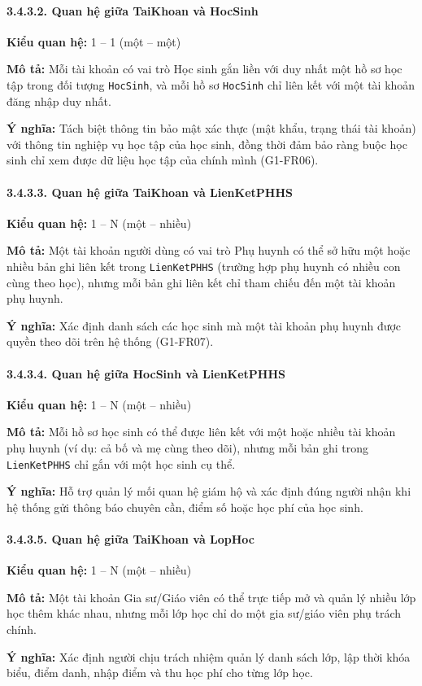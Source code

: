 \paragraph{3.4.3.2. Quan hệ giữa TaiKhoan và HocSinh}\mbox{}\par
\textbf{Kiểu quan hệ:} 1 -- 1 (một -- một)\par
\textbf{Mô tả:} Mỗi tài khoản có vai trò Học sinh gắn liền với duy nhất một hồ sơ học tập trong đối tượng \texttt{HocSinh}, và mỗi hồ sơ \texttt{HocSinh} chỉ liên kết với một tài khoản đăng nhập duy nhất.\par
\textbf{Ý nghĩa:} Tách biệt thông tin bảo mật xác thực (mật khẩu, trạng thái tài khoản) với thông tin nghiệp vụ học tập của học sinh, đồng thời đảm bảo ràng buộc học sinh chỉ xem được dữ liệu học tập của chính mình (G1-FR06).

\paragraph{3.4.3.3. Quan hệ giữa TaiKhoan và LienKetPHHS}\mbox{}\par
\textbf{Kiểu quan hệ:} 1 -- N (một -- nhiều)\par
\textbf{Mô tả:} Một tài khoản người dùng có vai trò Phụ huynh có thể sở hữu một hoặc nhiều bản ghi liên kết trong \texttt{LienKetPHHS} (trường hợp phụ huynh có nhiều con cùng theo học), nhưng mỗi bản ghi liên kết chỉ tham chiếu đến một tài khoản phụ huynh.\par
\textbf{Ý nghĩa:} Xác định danh sách các học sinh mà một tài khoản phụ huynh được quyền theo dõi trên hệ thống (G1-FR07).

\paragraph{3.4.3.4. Quan hệ giữa HocSinh và LienKetPHHS}\mbox{}\par
\textbf{Kiểu quan hệ:} 1 -- N (một -- nhiều)\par
\textbf{Mô tả:} Mỗi hồ sơ học sinh có thể được liên kết với một hoặc nhiều tài khoản phụ huynh (ví dụ: cả bố và mẹ cùng theo dõi), nhưng mỗi bản ghi trong \texttt{LienKetPHHS} chỉ gắn với một học sinh cụ thể.\par
\textbf{Ý nghĩa:} Hỗ trợ quản lý mối quan hệ giám hộ và xác định đúng người nhận khi hệ thống gửi thông báo chuyên cần, điểm số hoặc học phí của học sinh.

\paragraph{3.4.3.5. Quan hệ giữa TaiKhoan và LopHoc}\mbox{}\par
\textbf{Kiểu quan hệ:} 1 -- N (một -- nhiều)\par
\textbf{Mô tả:} Một tài khoản Gia sư/Giáo viên có thể trực tiếp mở và quản lý nhiều lớp học thêm khác nhau, nhưng mỗi lớp học chỉ do một gia sư/giáo viên phụ trách chính.\par
\textbf{Ý nghĩa:} Xác định người chịu trách nhiệm quản lý danh sách lớp, lập thời khóa biểu, điểm danh, nhập điểm và thu học phí cho từng lớp học.

